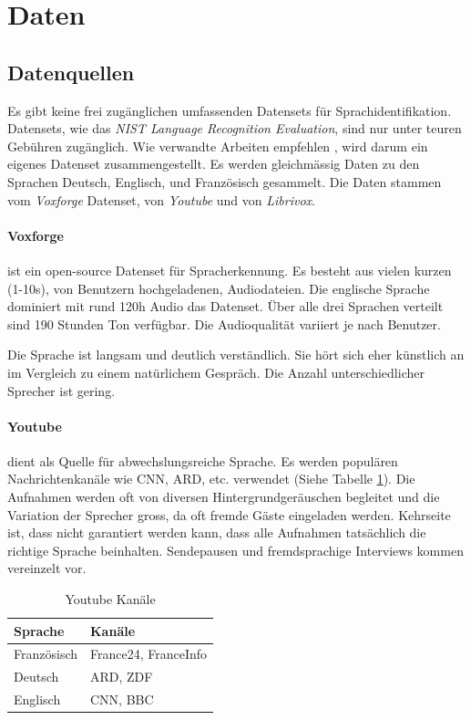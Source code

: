 \section{Daten}


\subsection{Datenquellen}
Es gibt keine frei zugänglichen umfassenden Datensets für Sprachidentifikation. Datensets, wie das \textit{NIST Language Recognition Evaluation}\cite{nist}, sind nur unter teuren Gebühren zugänglich. Wie verwandte Arbeiten empfehlen \cite{iLID}, wird darum ein eigenes Datenset zusammengestellt. Es werden gleichmässig Daten zu den Sprachen Deutsch, Englisch, und Französisch gesammelt. Die Daten stammen vom \textit{Voxforge}\cite{voxforge} Datenset, von \textit{Youtube}\cite{youtube} und von \textit{Librivox}\cite{librivox}.

\paragraph{Voxforge} ist ein open-source Datenset für Spracherkennung. Es besteht aus vielen kurzen (1-10s), von Benutzern hochgeladenen, Audiodateien. Die englische Sprache dominiert mit rund 120h Audio das Datenset. Über alle drei Sprachen verteilt sind 190 Stunden Ton verfügbar. Die Audioqualität variiert je nach Benutzer.

Die Sprache ist langsam und deutlich verständlich. Sie hört sich eher künstlich an im Vergleich zu einem natürlichem Gespräch. Die Anzahl unterschiedlicher Sprecher ist gering.

\paragraph{Youtube}dient als Quelle für abwechslungsreiche Sprache. Es werden populären Nachrichtenkanäle wie CNN, ARD, etc. verwendet (Siehe Tabelle \ref{tab:channels}). Die Aufnahmen werden oft von diversen Hintergrundgeräuschen begleitet und die Variation der Sprecher gross, da oft fremde Gäste eingeladen werden. Kehrseite ist, dass nicht garantiert werden kann, dass alle Aufnahmen tatsächlich die richtige Sprache beinhalten. Sendepausen und fremdsprachige Interviews kommen vereinzelt vor.
\begin{table}[h]
        \centering
        \begin{tabular}[t]{l || l}
        Sprache & Kanäle \\
        \hline \hline
        Französisch & France24, FranceInfo\\
        Deutsch & ARD, ZDF\\
        Englisch & CNN,  BBC
        \end{tabular}
        \caption{Youtube Kanäle}
        \label{tab:channels}
\end{table}

